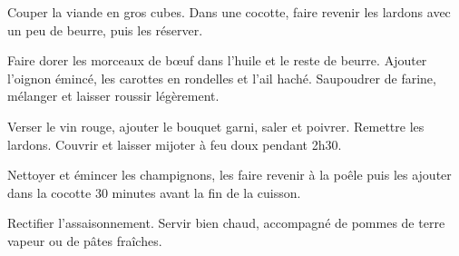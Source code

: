 \begin{nouvellerecette}


Couper la viande en gros cubes. Dans une cocotte, faire revenir les lardons avec un peu de beurre, puis les réserver.

Faire dorer les morceaux de bœuf dans l’huile et le reste de beurre. Ajouter l’oignon émincé, les carottes en rondelles et l’ail haché. Saupoudrer de farine, mélanger et laisser roussir légèrement.

Verser le vin rouge, ajouter le bouquet garni, saler et poivrer. Remettre les lardons. Couvrir et laisser mijoter à feu doux pendant 2h30.

Nettoyer et émincer les champignons, les faire revenir à la poêle puis les ajouter dans la cocotte 30 minutes avant la fin de la cuisson.

Rectifier l’assaisonnement. Servir bien chaud, accompagné de pommes de terre vapeur ou de pâtes fraîches.


\end{nouvellerecette}
